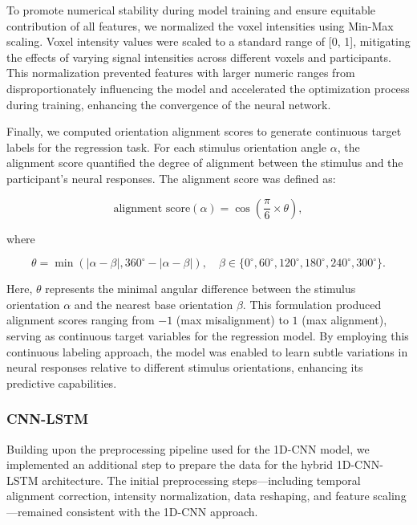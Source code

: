 \documentclass[a4paper]{article}
\begin{document}
To promote numerical stability during model training and ensure equitable contribution of all features, we normalized the voxel intensities using Min-Max scaling. Voxel intensity values were scaled to a standard range of [0, 1], mitigating the effects of varying signal intensities across different voxels and participants. This normalization prevented features with larger numeric ranges from disproportionately influencing the model and accelerated the optimization process during training, enhancing the convergence of the neural network.

Finally, we computed orientation alignment scores to generate continuous target labels for the regression task. For each stimulus orientation angle \(\alpha\), the alignment score quantified the degree of alignment between the stimulus and the participant's neural responses. The alignment score was defined as:

\begin{equation}
\text{alignment score}(\alpha) = \cos\left( \frac{\pi}{6} \times \theta \right),
\label{eq:alignment_score}
\end{equation}

\noindent where

\[
\theta = \min\left( |\alpha - \beta|, 360^\circ - |\alpha - \beta| \right), \quad \beta \in \{0^\circ, 60^\circ, 120^\circ, 180^\circ, 240^\circ, 300^\circ\}.
\]

\noindent Here, \(\theta\) represents the minimal angular difference between the stimulus orientation \(\alpha\) and the nearest base orientation \(\beta\). This formulation produced alignment scores ranging from \(-1\) (max misalignment) to \(1\) (max alignment), serving as continuous target variables for the regression model. By employing this continuous labeling approach, the model was enabled to learn subtle variations in neural responses relative to different stimulus orientations, enhancing its predictive capabilities.

\subsubsection{\textbf{CNN-LSTM}}
Building upon the preprocessing pipeline used for the 1D-CNN model, we implemented an additional step to prepare the data for the hybrid 1D-CNN-LSTM architecture. The initial preprocessing steps—including temporal alignment correction, intensity normalization, data reshaping, and feature scaling—remained consistent with the 1D-CNN approach.
\end{document}
